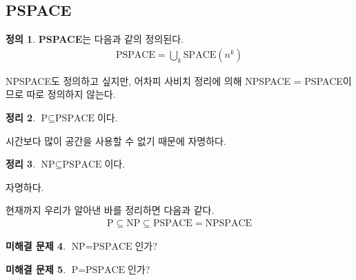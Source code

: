 \documentclass[a4paper, 11pt]{article}
\theoremstyle{definition}
\newtheorem{defn}{정의}[section]
\newtheorem{thm}[defn]{정리}
\newtheorem{oq}[defn]{미해결 문제}
\newenvironment{pf*}{\pushQED{\qed}\pf}
{\popQED\endpf}
\begin{document}
\subsection{PSPACE}
\begin{defn}
    \textbf{PSPACE}는 다음과 같의 정의된다.
    \begin{align*}
        \text{PSPACE} = \bigcup_k \text{SPACE}(n^k)
    \end{align*}
\end{defn}
NPSPACE도 정의하고 싶지만, 어차피 사비치 정리에 의해 NPSPACE = PSPACE이므로 따로 정의하지 않는다.
\begin{thm}
    $\text{P} \subseteq \text{PSPACE}$이다.
\end{thm}
\begin{pf*}
    시간보다 많이 공간을 사용할 수 없기 때문에 자명하다.
\end{pf*}
\begin{thm}
    $\text{NP} \subseteq \text{PSPACE}$이다.
\end{thm}
\begin{pf*}
    자명하다.
\end{pf*}
현재까지 우리가 알아낸 바를 정리하면 다음과 같다.
\begin{align*}
    \text{P} \subseteq \text{NP} \subseteq \text{PSPACE} = \text{NPSPACE}
\end{align*}
\begin{oq}
    $\text{NP} = \text{PSPACE}$인가?
\end{oq}
\begin{oq}
    $\text{P} = \text{PSPACE}$인가?
\end{oq}
\end{document}
